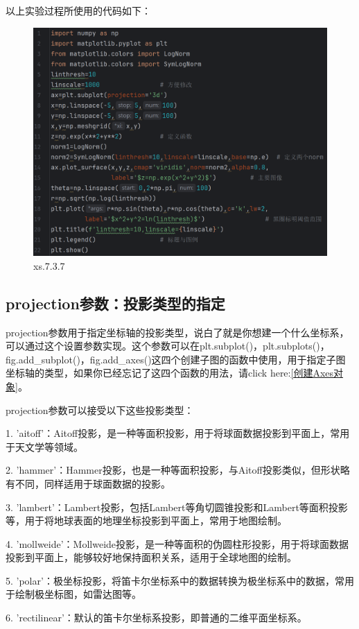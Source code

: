 \documentclass[12pt]{article}
\begin{document}
以上实验过程所使用的代码如下：
\begin{figure}[H]
    \centering
    \includegraphics[width=0.75\linewidth]{norm program1.png}
    \caption{xs.7.3.7}
    \label{fig:enter-label}
\end{figure}



\newpage

\subsection{projection参数：投影类型的指定}\label{projection参数：投影类型的指定}
projection参数用于指定坐标轴的投影类型，说白了就是你想建一个什么坐标系，可以通过这个设置参数实现。这个参数可以在plt.subplot()，plt.subplots()，fig.add\_subplot()，fig.add\_axes()这四个创建子图的函数中使用，用于指定子图坐标轴的类型，如果你已经忘记了这四个函数的用法，请click here:\ref{创建Axes对象}。

projection参数可以接受以下这些投影类型：

1. 'aitoff'：Aitoff投影，是一种等面积投影，用于将球面数据投影到平面上，常用于天文学等领域。

2. 'hammer'：Hammer投影，也是一种等面积投影，与Aitoff投影类似，但形状略有不同，同样适用于球面数据的投影。

3. 'lambert'：Lambert投影，包括Lambert等角切圆锥投影和Lambert等面积投影等，用于将地球表面的地理坐标投影到平面上，常用于地图绘制。

4. 'mollweide'：Mollweide投影，是一种等面积的伪圆柱形投影，用于将球面数据投影到平面上，能够较好地保持面积关系，适用于全球地图的绘制。

5. 'polar'：极坐标投影，将笛卡尔坐标系中的数据转换为极坐标系中的数据，常用于绘制极坐标图，如雷达图等。

6. 'rectilinear'：默认的笛卡尔坐标系投影，即普通的二维平面坐标系。
\end{document}

